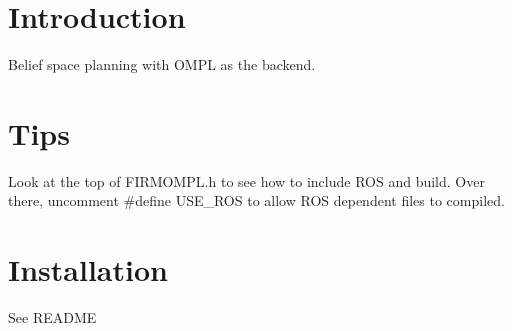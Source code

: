 \hypertarget{index_Introduction}{}\section{Introduction}\label{index_Introduction}
Belief space planning with O\-M\-P\-L as the backend.\hypertarget{index_Tips}{}\section{Tips}\label{index_Tips}
Look at the top of F\-I\-R\-M\-O\-M\-P\-L.\-h to see how to include R\-O\-S and build. Over there, uncomment \#define U\-S\-E\-\_\-\-R\-O\-S to allow R\-O\-S dependent files to compiled.\hypertarget{index_install_sec}{}\section{Installation}\label{index_install_sec}
See R\-E\-A\-D\-M\-E 